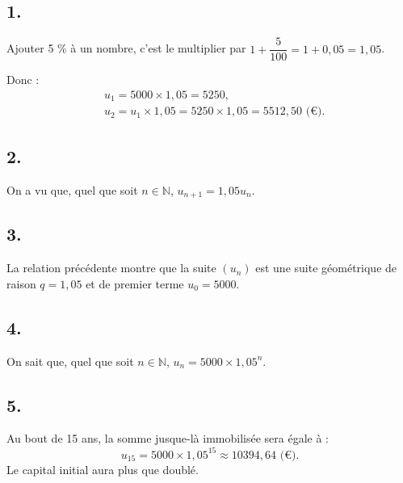 \subsection*{1.}

Ajouter 5 \% à un nombre, c'est le multiplier par \(1 + \dfrac{5}{100} = 1 + 0{,}05= 1{,}05\).

Donc :
\begin{align*}
&u_1 = 5000 \times 1{,}05 = 5250, \\
&u_2 = u_1 \times 1{,}05 = 5250 \times 1{,}05 = 5512{,}50 \text{ (€)}.
\end{align*}

\subsection*{2.}

On a vu que, quel que soit \(n \in \mathbb{N}\), \(u_{n+1} = 1{,}05u_n\).

\subsection*{3.}

La relation précédente montre que la suite \( (u_n) \) est une suite géométrique de raison \(q = 1{,}05\) et de premier terme \(u_0 = 5000\).

\subsection*{4.}

On sait que, quel que soit \(n \in \mathbb{N}\), \(u_n = 5000 \times 1{,}05^n\).

\subsection*{5.}

Au bout de 15 ans, la somme jusque-là immobilisée sera égale à :
\[
u_{15} = 5000 \times 1{,}05^{15} \approx 10394{,}64 \text{ (€)}.
\]
Le capital initial aura plus que doublé.
